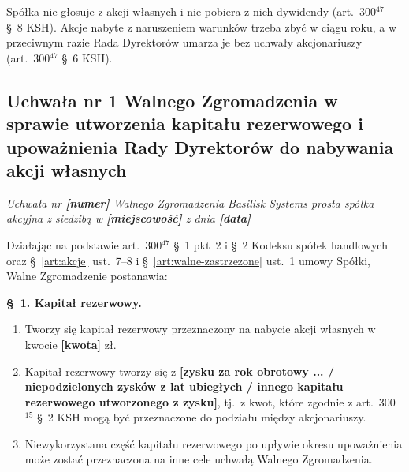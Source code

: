 \documentclass[12pt,a4paper]{report}
\newcommand{\field}[1]{\textbf{[#1]}}
\newcommand{\CompanyFull}{Basilisk Systems prosta spółka akcyjna}
\begin{document}
Spółka nie głosuje z akcji własnych i nie pobiera z nich dywidendy (art.~300$^{47}$ §~8 KSH). Akcje nabyte z naruszeniem warunków trzeba zbyć w ciągu roku, a w przeciwnym razie Rada Dyrektorów umarza je bez uchwały akcjonariuszy (art.~300$^{47}$ §~6 KSH).

\subsection*{Uchwała nr 1 Walnego Zgromadzenia w sprawie utworzenia kapitału rezerwowego i upoważnienia Rady Dyrektorów do nabywania akcji własnych}

\textit{Uchwała nr \field{numer} Walnego Zgromadzenia \CompanyFull{} z siedzibą w \field{miejscowość} z dnia \field{data}}

Działając na podstawie art.~300$^{47}$ §~1 pkt~2 i §~2 Kodeksu spółek handlowych oraz §~\ref{art:akcje} ust.~7--8 i §~\ref{art:walne-zastrzezone} ust.~1 umowy Spółki, Walne Zgromadzenie postanawia:

\textbf{§~1. Kapitał rezerwowy.}
\begin{enumerate}
  \item Tworzy się kapitał rezerwowy przeznaczony na nabycie akcji własnych w kwocie \field{kwota} zł.
  \item Kapitał rezerwowy tworzy się z \field{zysku za rok obrotowy ... / niepodzielonych zysków z lat ubiegłych / innego kapitału rezerwowego utworzonego z zysku}, tj.\ z kwot, które zgodnie z art.~300$^{15}$ §~2 KSH mogą być przeznaczone do podziału między akcjonariuszy.
  \item Niewykorzystana część kapitału rezerwowego po upływie okresu upoważnienia może zostać przeznaczona na inne cele uchwałą Walnego Zgromadzenia.
\end{enumerate}
\end{document}
